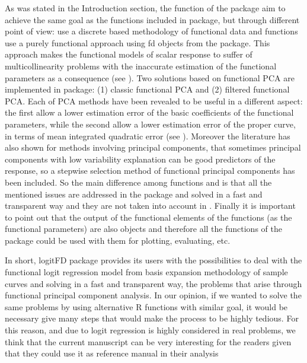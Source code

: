 As was stated in the Introduction section, the  function of the  package aim to achieve the same goal as the functions included in  package, but through different point of view:  use a discrete based methodology of functional data and  functions use a purely functional approach using fd objects from the  package. This approach makes the functional models of scalar response to suffer of multicollinearity problems with the inaccurate estimation of the functional parameters as a consequence (see \cite{Escabias04}). Two solutions based on functional PCA are implemented in  package: (1) classic functional PCA and (2) filtered functional PCA. Each of PCA methods have been revealed to be useful in a different aspect: the first allow a lower estimation error of the basic coefficients of the functional parameters, while the second allow a lower estimation error of the proper curve, in terms of mean integrated quadratic error (see \cite{Escabias04}). Moreover the literature has also shown for methods involving principal components, that sometimes principal components with low variability explanation can be good predictors of the response, so a stepwise selection method of functional principal components has been included. So the main difference among  functions and  is that all the mentioned issues are addressed in the  package and solved in a fast and transparent way and they are not taken into account in . Finally it is important to point out that the output of the functional elements of the  functions (as the functional parameters) are also  objects and therefore all the functions of the  package could be used with them for plotting, evaluating, etc.

In short, logitFD package provides its users with the possibilities to deal with the functional logit regression model from basis expansion methodology of sample curves and solving in a fast and transparent way, the problems that arise through functional principal component analysis. In our opinion, if we wanted to solve the same problems by using alternative R functions with similar goal, it would be necessary give many steps that would make the process to be highly tedious. For this reason, and due to logit regression is highly considered in real problems, we think that the current manuscript can be very interesting for the readers given that they could use it as reference manual in their analysis

